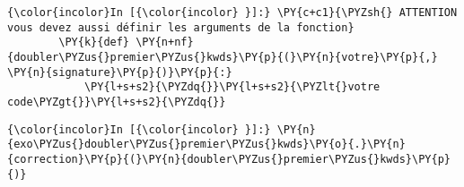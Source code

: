     \begin{Verbatim}[commandchars=\\\{\}]
{\color{incolor}In [{\color{incolor} }]:} \PY{c+c1}{\PYZsh{} ATTENTION vous devez aussi définir les arguments de la fonction}
        \PY{k}{def} \PY{n+nf}{doubler\PYZus{}premier\PYZus{}kwds}\PY{p}{(}\PY{n}{votre}\PY{p}{,} \PY{n}{signature}\PY{p}{)}\PY{p}{:}
            \PY{l+s+s2}{\PYZdq{}}\PY{l+s+s2}{\PYZlt{}votre code\PYZgt{}}\PY{l+s+s2}{\PYZdq{}}
\end{Verbatim}


    \begin{Verbatim}[commandchars=\\\{\}]
{\color{incolor}In [{\color{incolor} }]:} \PY{n}{exo\PYZus{}doubler\PYZus{}premier\PYZus{}kwds}\PY{o}{.}\PY{n}{correction}\PY{p}{(}\PY{n}{doubler\PYZus{}premier\PYZus{}kwds}\PY{p}{)}
\end{Verbatim}